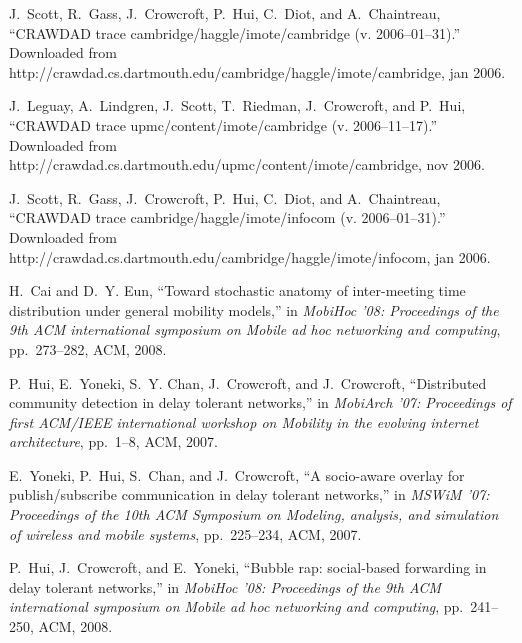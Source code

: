 \documentclass[conference]{IEEEtran}
\begin{document}
\begin{thebibliography}{10}
J.~Scott, R.~Gass, J.~Crowcroft, P.~Hui, C.~Diot, and A.~Chaintreau,
  ``{CRAWDAD} trace cambridge/haggle/imote/cambridge (v. 2006--01--31).''
  Downloaded from
  http://craw\-dad.cs.dart\-mouth.edu/cam\-bridge/hag\-gle/imo\-te/cam\-bri\-dge, jan 2006.

J.~Leguay, A.~Lindgren, J.~Scott, T.~Riedman, J.~Crow\-croft, and P.~Hui,
  ``{CRAW\-DAD} trace upmc/content/imote/cambridge (v. 2006--11--17).''
  Downloaded from
  http://craw\-dad.cs.dart\-mouth.edu/\-upmc/con\-tent/imo\-te/cam\-bri\-dge,
  nov 2006.

J.~Scott, R.~Gass, J.~Crowcroft, P.~Hui, C.~Diot, and A.~Chaintreau,
  ``{CRAWDAD} trace cambridge/haggle/imote/infocom (v. 2006--01--31).''
  Downloaded from
  http://craw\-dad.cs.dart\-mouth.edu/cam\-bridge/hag\-gle/imote/infocom, jan
  2006.

H.~Cai and D.~Y. Eun, ``Toward stochastic anatomy of inter-meeting time
  distribution under general mobility models,'' in {\em MobiHoc '08:
  Proceedings of the 9th ACM international symposium on Mobile ad hoc
  networking and computing}, pp.~273--282, ACM, 2008.

P.~Hui, E.~Yoneki, S.~Y. Chan, J.~Crowcroft, and J.~Crowcroft, ``Distributed
  community detection in delay tolerant networks,'' in {\em MobiArch '07:
  Proceedings of first ACM/IEEE international workshop on Mobility in the
  evolving internet architecture}, pp.~1--8, ACM, 2007.

E.~Yoneki, P.~Hui, S.~Chan, and J.~Crowcroft, ``A socio-aware overlay for
  publish/subscribe communication in delay tolerant networks,'' in {\em MSWiM
  '07: Proceedings of the 10th ACM Symposium on Modeling, analysis, and
  simulation of wireless and mobile systems}, pp.~225--234, ACM, 2007.

P.~Hui, J.~Crowcroft, and E.~Yoneki, ``Bubble rap: social-based forwarding in
  delay tolerant networks,'' in {\em MobiHoc '08: Proceedings of the 9th ACM
  international symposium on Mobile ad hoc networking and computing},
  pp.~241--250, ACM, 2008.

\end{thebibliography}
\end{document}
